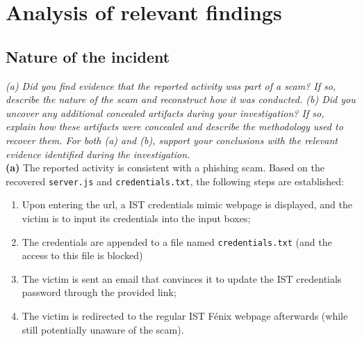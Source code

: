 \documentclass[11pt,a4paper,final,oneside]{article}
\begin{document}
\section{Analysis of relevant findings}
\label{sec:analysis-of-relevant-findings}

\subsection{Nature of the incident}

\textit{
(a) Did you find evidence that the reported activity was part of a scam? If so, describe the nature of the scam and reconstruct how it was conducted. (b) Did you uncover any additional concealed artifacts during your investigation? If so, explain how these artifacts were concealed and describe the methodology used to recover them. For both (a) and (b), support your conclusions with the relevant evidence identified during the investigation.}
\\

\textbf{(a)}
The reported activity is consistent with a phishing scam. Based on the recovered \texttt{server.js} and \texttt{credentials.txt}, the following steps are established:
\begin{enumerate}
  \item Upon entering the url, a IST credentials mimic webpage is displayed, and the victim is to input its credentials into the input boxes;
  \item The credentials are appended to a file named \texttt{credentials.txt} (and the access to this file is blocked)
  \item The victim is sent an email that convinces it to update the IST credentials password through the provided link;
  \item The victim is redirected to the regular IST F\'enix webpage afterwards (while still potentially unaware of the scam).
\end{enumerate}
\end{document}

